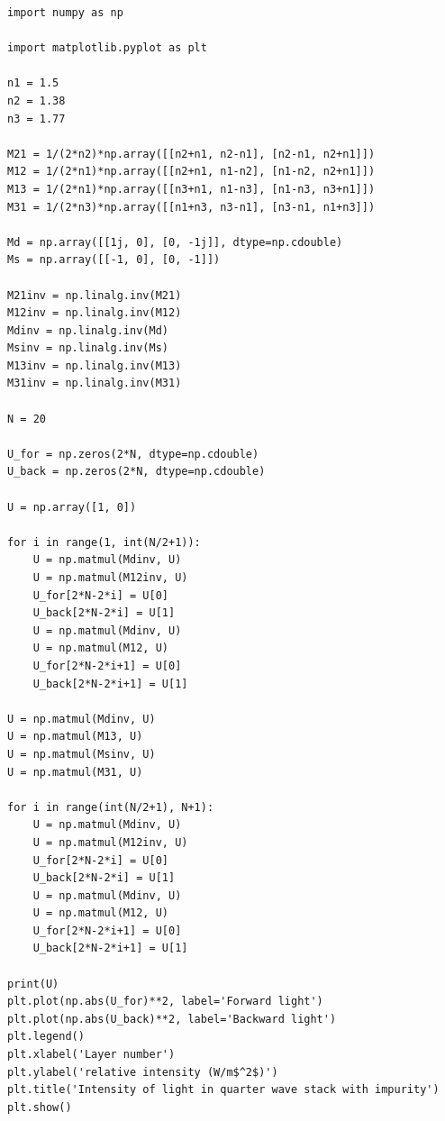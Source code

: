 \documentclass[letterpaper, reqno,11pt]{article}
\begin{document}
\begin{lstlisting}
import numpy as np

import matplotlib.pyplot as plt

n1 = 1.5
n2 = 1.38
n3 = 1.77

M21 = 1/(2*n2)*np.array([[n2+n1, n2-n1], [n2-n1, n2+n1]])
M12 = 1/(2*n1)*np.array([[n2+n1, n1-n2], [n1-n2, n2+n1]])
M13 = 1/(2*n1)*np.array([[n3+n1, n1-n3], [n1-n3, n3+n1]])
M31 = 1/(2*n3)*np.array([[n1+n3, n3-n1], [n3-n1, n1+n3]])

Md = np.array([[1j, 0], [0, -1j]], dtype=np.cdouble)
Ms = np.array([[-1, 0], [0, -1]])

M21inv = np.linalg.inv(M21)
M12inv = np.linalg.inv(M12)
Mdinv = np.linalg.inv(Md)
Msinv = np.linalg.inv(Ms)
M13inv = np.linalg.inv(M13)
M31inv = np.linalg.inv(M31)

N = 20

U_for = np.zeros(2*N, dtype=np.cdouble)
U_back = np.zeros(2*N, dtype=np.cdouble)

U = np.array([1, 0])

for i in range(1, int(N/2+1)):
    U = np.matmul(Mdinv, U)
    U = np.matmul(M12inv, U)
    U_for[2*N-2*i] = U[0]
    U_back[2*N-2*i] = U[1]
    U = np.matmul(Mdinv, U)
    U = np.matmul(M12, U)
    U_for[2*N-2*i+1] = U[0]
    U_back[2*N-2*i+1] = U[1]

U = np.matmul(Mdinv, U)
U = np.matmul(M13, U)
U = np.matmul(Msinv, U)
U = np.matmul(M31, U)

for i in range(int(N/2+1), N+1):
    U = np.matmul(Mdinv, U)
    U = np.matmul(M12inv, U)
    U_for[2*N-2*i] = U[0]
    U_back[2*N-2*i] = U[1]
    U = np.matmul(Mdinv, U)
    U = np.matmul(M12, U)
    U_for[2*N-2*i+1] = U[0]
    U_back[2*N-2*i+1] = U[1]

print(U)
plt.plot(np.abs(U_for)**2, label='Forward light')
plt.plot(np.abs(U_back)**2, label='Backward light')
plt.legend()
plt.xlabel('Layer number')
plt.ylabel('relative intensity (W/m$^2$)')
plt.title('Intensity of light in quarter wave stack with impurity')
plt.show()

\end{lstlisting}
\end{document}
